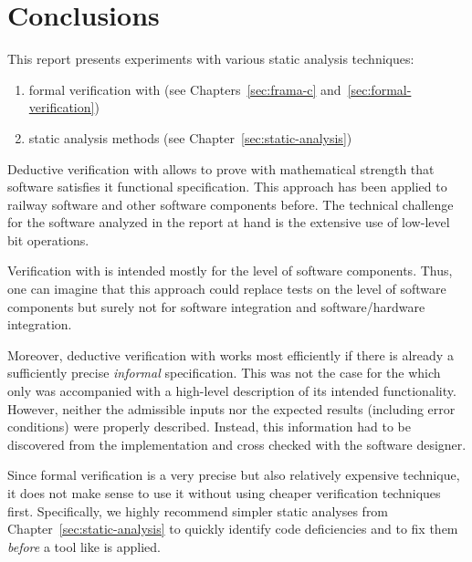 
\chapter{Conclusions}
\label{sec:conclusions}

This report presents experiments with various static analysis techniques:

\begin{enumerate}
\item formal verification with \framacwp (see Chapters~\ref{sec:frama-c}
      and~\ref{sec:formal-verification})
\item static analysis methods (see Chapter~\ref{sec:static-analysis})
\end{enumerate}


Deductive verification with \framacwp allows to prove with mathematical strength
that software satisfies it functional specification.
This approach has been applied to railway software \cite{INDIN2103-FOKUS}
and other software components\cite{thesisKimVoellinger} before.
The technical challenge for the software analyzed in the report at hand is
the extensive use of low-level bit operations.

Verification with \framacwp is intended mostly for the level of software components.
Thus, one can imagine that this approach could replace tests on the 
level of software components but surely not for software integration
and software\slash hardware integration.

Moreover, deductive verification with \framacwp works most efficiently
if there is already a sufficiently precise \emph{informal} specification.
This was not the case for the \bitwalker which only was accompanied with
a high-level description of its intended functionality.
However, neither the admissible inputs nor the expected results (including error conditions)
were properly described.
Instead, this information had to be discovered from the implementation and cross checked
with the software designer.

Since formal verification is a very precise but also relatively expensive technique,
it does not make sense to use it without using cheaper verification techniques first.
Specifically, we highly recommend  simpler static analyses from 
Chapter~\ref{sec:static-analysis} to quickly identify code deficiencies
and to fix them \emph{before} a tool like \framacwp is applied.

